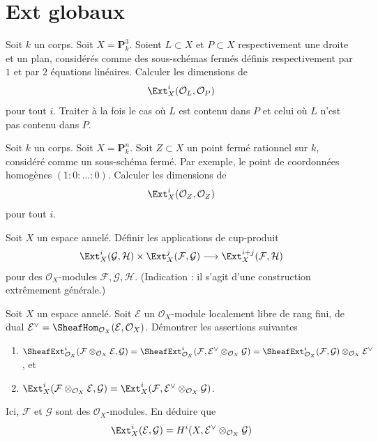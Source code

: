 \section{Ext globaux}
\label{section-global-exts}

\begin{exercise}
\label{exercise-ext-line-plane-p3}
Soit $k$ un corps. Soit $X = \mathbf{P}^3_k$. Soient $L \subset X$
et $P \subset X$ respectivement une droite et un plan, considérés comme des sous-schémas fermés
définis respectivement par $1$ et par $2$ équations linéaires. Calculer
les dimensions de
$$
\Ext^i_X(\mathcal{O}_L, \mathcal{O}_P)
$$
pour tout $i$.
Traiter à la fois le cas où $L$ est contenu dans $P$ et
celui où $L$ n'est pas contenu dans $P$.
\end{exercise}

\begin{exercise}
\label{exercise-ext-point}
Soit $k$ un corps. Soit $X = \mathbf{P}^n_k$. Soit $Z \subset X$
un point fermé rationnel sur $k$, considéré comme un sous-schéma fermé.
Par exemple, le point de coordonnées homogènes
$(1 : 0 : \ldots : 0)$. Calculer les dimensions de
$$
\Ext^i_X(\mathcal{O}_Z, \mathcal{O}_Z)
$$
pour tout $i$.
\end{exercise}

\begin{exercise}
\label{exercise-ext-pairings}
Soit $X$ un espace annelé. Définir les applications de cup-produit
$$
\Ext^i_X(\mathcal{G}, \mathcal{H})
\times
\Ext^j_X(\mathcal{F}, \mathcal{G})
\longrightarrow
\Ext^{i + j}_X(\mathcal{F}, \mathcal{H})
$$
pour des $\mathcal{O}_X$-modules $\mathcal{F}, \mathcal{G}, \mathcal{H}$.
(Indication : il s'agit d'une construction extrêmement générale.)
\end{exercise}

\begin{exercise}
\label{exercise-move-out-locally-free}
Soit $X$ un espace annelé. Soit $\mathcal{E}$ un
$\mathcal{O}_X$-module localement libre de rang fini, de dual
$\mathcal{E}^\vee = \SheafHom_{\mathcal{O}_X}(\mathcal{E}, \mathcal{O}_X)$.
Démontrer les assertions suivantes
\begin{enumerate}
\item $\SheafExt^i_{\mathcal{O}_X}(
\mathcal{F} \otimes_{\mathcal{O}_X} \mathcal{E}, \mathcal{G}) =
\SheafExt^i_{\mathcal{O}_X}(
\mathcal{F},
\mathcal{E}^\vee \otimes_{\mathcal{O}_X} \mathcal{G}) =
\SheafExt^i_{\mathcal{O}_X}(
\mathcal{F}, \mathcal{G}) \otimes_{\mathcal{O}_X} \mathcal{E}^\vee$, et
\item $\Ext^i_X(
\mathcal{F} \otimes_{\mathcal{O}_X} \mathcal{E}, \mathcal{G}) =
\Ext^i_X(\mathcal{F},
\mathcal{E}^\vee \otimes_{\mathcal{O}_X} \mathcal{G})$.
\end{enumerate}
Ici, $\mathcal{F}$ et $\mathcal{G}$ sont des $\mathcal{O}_X$-modules. En déduire
que
$$
\Ext^i_X(\mathcal{E}, \mathcal{G}) =
H^i(X, \mathcal{E}^\vee \otimes_{\mathcal{O}_X} \mathcal{G})
$$
\end{exercise}

